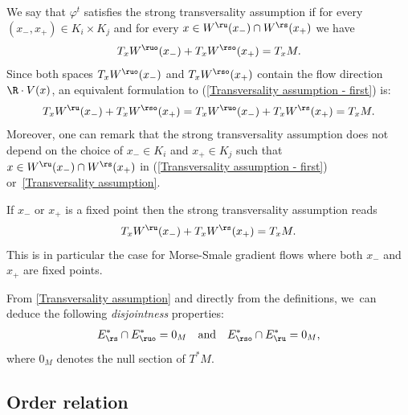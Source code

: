 We say that $\varphi^t$ satisfies the strong transversality assumption if for every $(x_-,x_+) \in K_i \times K_j$ and for every $x \in W^\ru (x_-) \cap W^\rs (x_+)$ we have
\begin{equation}\label{Transversality assumption - first}
T_x W^{\ruo} (x_-) + T_x W^{\rso} (x_+) = T_x M.
\end{equation}
Since both spaces $T_x W^{\ruo} (x_-) $ and $T_x W^{\rso} (x_+)$ contain the flow direction $\R\cdot V(x)$, an equivalent formulation to (\ref{Transversality assumption - first}) is:
\begin{equation}\label{Transversality assumption}
T_x W^{\ru} (x_-) + T_x W^{\rso} (x_+) = T_x W^{\ruo} (x_-) + T_x W^{\rs} (x_+) = T_x M.
\end{equation}
Moreover, one can remark that the strong transversality assumption does not depend on the choice of $x_- \in K_i$ and $x_+ \in K_j$ such that $x \in W^\ru (x_-) \cap W^\rs (x_+)$ in (\ref{Transversality assumption - first}) or~\eqref{Transversality assumption}.
\begin{remark}If $x_-$ or $x_+$ is a fixed point then the strong transversality assumption reads
\[
T_x W^{\ru} (x_-) + T_x W^{\rs} (x_+) = T_x M.
\]
This is in particular the case for Morse-Smale gradient flows \cite{DR0} where both $x_-$ and~$x_+$ are fixed points.
\end{remark}

From \eqref{Transversality assumption} and directly from the definitions, we~can deduce the following \textit{disjointness} properties:
\begin{align*}
E_\rs^* \cap E_{\ruo}^* = 0_M \quad\text{and}\quad E_{\rso}^* \cap E_\ru^* = 0_M,
\end{align*}
where $0_M$ denotes the null section of $T^*M$.

\subsection{Order relation}

